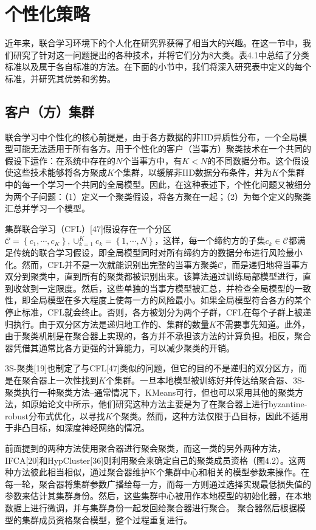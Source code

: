 \section{个性化策略}
近年来，联合学习环境下的个人化在研究界获得了相当大的兴趣。在这一节中，我们研究了针对这一问题提出的各种技术，并将它们分为8大类。表4.1中总结了分类标准以及属于各自标准的方法。在下面的小节中，我们将深入研究表中定义的每个标准，并研究其优势和劣势。

\subsection{客户（方）集群}
联合学习中个性化的核心前提是，由于各方数据的非IID异质性分布，一个全局模型可能无法适用于所有各方。用于个性化的客户（当事方）聚类技术在一个共同的假设下运作：在系统中存在的$N$个当事方中，有$K<N$的不同数据分布。这个假设使这些技术能够将各方聚成$K$个集群，以缓解非IID数据分布条件，并为$K$个集群中的每一个学习一个共同的全局模型。因此，在这种表述下，个性化问题又被细分为两个子问题：（1）定义一个聚类假设，将各方聚在一起；（2）为每个定义的聚类汇总并学习一个模型。

集群联合学习（CFL）[47]假设存在一个分区$\mathcal{C} = \left\{ c_{1}, \cdots, c_{K} \right\}, \cup_{k=1}^{K} c_{k} = \left\{ 1, \cdots, N \right\}$，这样，每一个缔约方的子集$c_{k} \in \mathcal{C}$都满足传统的联合学习假设，即全局模型同时对所有缔约方的数据分布进行风险最小化。然而，CFL并不是一次就能识别出完整的当事方聚类$\mathcal{C}$，而是递归地将当事方双分到聚类中，直到所有的聚类都被识别出来。该算法通过训练局部模型进行，直到收敛到一定限度。然后，这些单独的当事方模型被汇总，并检查全局模型的一致性，即全局模型在多大程度上使每一方的风险最小。如果全局模型符合各方的某个停止标准，CFL就会终止。否则，各方被划分为两个子群，CFL在每个子群上被递归执行。由于双分区方法是递归地工作的、集群的数量$K$不需要事先知道。此外，由于聚类机制是在聚合器上实现的，各方并不承担该方法的计算负担。相反，聚合器凭借其通常比各方更强的计算能力，可以减少聚类的开销。

3S-聚类[19]也制定了与CFL[47]类似的问题，但它的目的不是递归的双分区方，而是在聚合器上一次性找到$K$个集群。一旦本地模型被训练好并传达给聚合器、3S-聚类执行一种聚类方法--通常情况下，KMeans可行，但也可以采用其他的聚类方法，如原始论文中所示，他们研究这种方法主要是为了在聚合器上进行byzantine-robust分布式优化，以寻找$K$个聚类。然而，这种方法仅限于凸目标，因此不适用于非凸目标，如深度神经网络的情况。

前面提到的两种方法使用聚合器进行聚会聚类，而这一类的另外两种方法，IFCA[20]和HypCluster[36]则利用聚会来确定自己的聚类成员资格（图4.2）。这两种方法彼此相当相似，通过聚合器维护K个集群中心和相关的模型参数来操作。在每一轮，聚合器将集群参数广播给每一方，而每一方则通过选择实现最低损失值的参数来估计其集群身份。然后，这些集群中心被用作本地模型的初始化器，在本地数据上进行微调，并与集群身份一起发回给聚合器进行聚合。
聚合器然后根据模型的集群成员资格聚合模型，整个过程重复进行。

